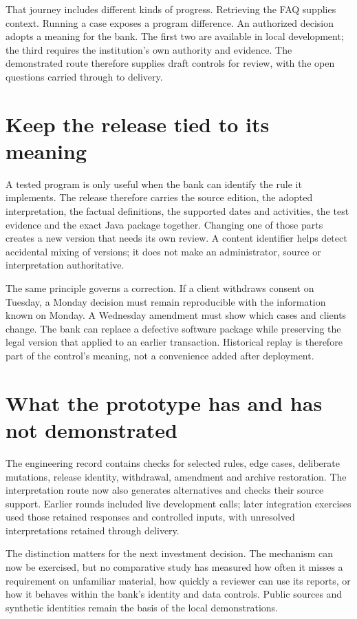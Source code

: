 \documentclass[12pt,a4paper,oneside,openany]{book}
\begin{document}
That journey includes different kinds of progress. Retrieving the FAQ supplies
context. Running a case exposes a program difference. An authorized decision
adopts a meaning for the bank. The first two are available in local development;
the third requires the institution's own authority and evidence. The demonstrated
route therefore supplies draft controls for review, with the open questions
carried through to delivery.

\section{Keep the release tied to its meaning}

A tested program is only useful when the bank can identify the rule it implements.
The release therefore carries the source edition, the adopted interpretation,
the factual definitions, the supported dates and activities, the test evidence
and the exact Java package together. Changing one of those parts creates a new
version that needs its own review. A content identifier helps detect accidental
mixing of versions; it does not make an administrator, source or interpretation
authoritative.

The same principle governs a correction. If a client withdraws consent on
Tuesday, a Monday decision must remain reproducible with the information known
on Monday. A Wednesday amendment must show which cases and clients change. The
bank can replace a defective software package while preserving the legal version
that applied to an earlier transaction. Historical replay is therefore part of
the control's meaning, not a convenience added after deployment.

\section{What the prototype has and has not demonstrated}

The engineering record contains checks for selected rules, edge cases,
deliberate mutations, release identity, withdrawal, amendment and archive
restoration. The interpretation route now also generates alternatives and
checks their source support. Earlier rounds included live development calls;
later integration exercises used those retained responses and controlled
inputs, with unresolved interpretations retained through delivery.

The distinction matters for the next investment decision. The mechanism can now
be exercised, but no comparative study has measured how often it misses a
requirement on unfamiliar material, how quickly a reviewer can use its reports,
or how it behaves within the bank's identity and data controls. Public sources
and synthetic identities remain the basis of the local demonstrations.
\end{document}
